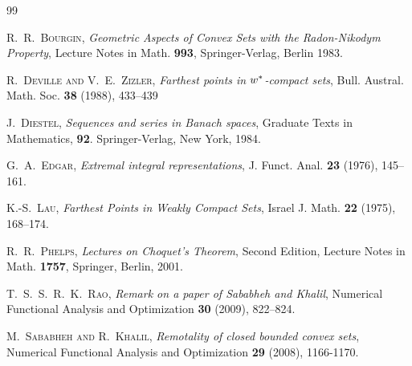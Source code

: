 \documentclass[11pt,a4paper]{amsart}
\theoremstyle{plain}
\theoremstyle{definition}
\begin{document}
\begin{thebibliography}{99}

 \textsc{R.~R.~Bourgin}, \emph{Geometric
    Aspects of Convex Sets with the Radon-Nikodym Property}, Lecture
    Notes in Math. \textbf{993}, Springer-Verlag, Berlin 1983.

   \textsc{R.~Deville and V.~E.~Zizler}, {\it Farthest points in
  $w\sp \ast$-compact sets},
   Bull. Austral. Math. Soc. \textbf{38} (1988), 433--439

   \textsc{J.~Diestel}, {\em Sequences and series in Banach spaces},
   Graduate Texts in Mathematics, {\bf 92}. Springer-Verlag, New York, 1984.

 \textsc{G.~A.~Edgar}, {\it Extremal integral
    representations},
    J. Funct. Anal. \textbf{23} (1976), 145--161.

 \textsc{K.-S.~Lau}, {\em Farthest Points in Weakly
    Compact Sets}, Israel J. Math. {\bf 22} (1975), 168--174.

 \textsc{R.~R.~Phelps}, {\em Lectures on
    Choquet's Theorem}, Second Edition, Lecture Notes in Math.
    {\bf 1757}, Springer, Berlin, 2001.

 \textsc{T.~S.~S.~R.~K.~Rao}, {\em Remark on a paper of
    Sababheh and Khalil},  Numerical Functional Analysis and Optimization \textbf{30} (2009), 822--824.

 \textsc{M.~Sababheh and R.~Khalil}, {\em Remotality of
    closed bounded convex sets}, Numerical Functional Analysis and
    Optimization {\bf 29} (2008), 1166-1170.

\end{thebibliography}
\end{document}
